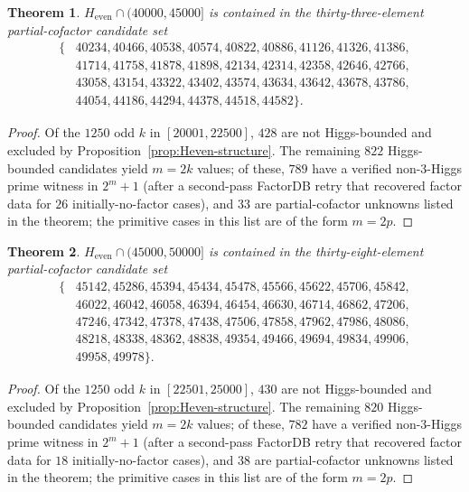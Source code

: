 \documentclass[11pt]{amsart}
\theoremstyle{plain}
\newtheorem{theorem}{Theorem}
\theoremstyle{definition}
\begin{document}
\begin{theorem}\label{thm:Heven-45000}
$H_{\mathrm{even}} \cap (40000, 45000]$ is contained in the
thirty-three-element partial-cofactor candidate set
\[
\begin{aligned}
\{ & 40234, 40466, 40538, 40574, 40822, 40886, 41126, 41326, 41386,\\
   & 41714, 41758, 41878, 41898, 42134, 42314, 42358, 42646, 42766,\\
   & 43058, 43154, 43322, 43402, 43574, 43634, 43642, 43678, 43786,\\
   & 44054, 44186, 44294, 44378, 44518, 44582 \}.
\end{aligned}
\]
\end{theorem}

\begin{proof}
Of the $1250$ odd $k$ in $[20001, 22500]$, $428$ are not
Higgs-bounded and excluded by Proposition~\ref{prop:Heven-structure}.
The remaining $822$ Higgs-bounded candidates yield $m = 2k$ values;
of these, $789$ have a verified non-3-Higgs prime witness in
$2^m + 1$ (after a second-pass FactorDB retry that recovered
factor data for $26$ initially-no-factor cases), and $33$ are
partial-cofactor unknowns listed in the theorem; the primitive cases in this list are of the form $m=2p$.
\end{proof}

\begin{theorem}\label{thm:Heven-50000}
$H_{\mathrm{even}} \cap (45000, 50000]$ is contained in the
thirty-eight-element partial-cofactor candidate set
\[
\begin{aligned}
\{ & 45142, 45286, 45394, 45434, 45478, 45566, 45622, 45706, 45842,\\
   & 46022, 46042, 46058, 46394, 46454, 46630, 46714, 46862, 47206,\\
   & 47246, 47342, 47378, 47438, 47506, 47858, 47962, 47986, 48086,\\
   & 48218, 48338, 48362, 48838, 49354, 49466, 49694, 49834, 49906,\\
   & 49958, 49978 \}.
\end{aligned}
\]
\end{theorem}

\begin{proof}
Of the $1250$ odd $k$ in $[22501, 25000]$, $430$ are not
Higgs-bounded and excluded by Proposition~\ref{prop:Heven-structure}.
The remaining $820$ Higgs-bounded candidates yield $m = 2k$ values;
of these, $782$ have a verified non-3-Higgs prime witness in
$2^m + 1$ (after a second-pass FactorDB retry that recovered
factor data for $18$ initially-no-factor cases), and $38$ are
partial-cofactor unknowns listed in the theorem; the primitive cases in this list are of the form $m=2p$.
\end{proof}
\end{document}
